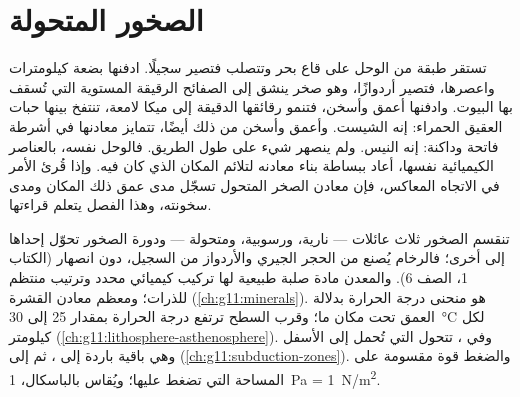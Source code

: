 \chapter{الصخور المتحولة}\label{ch:g12:metamorphic-rocks}

تستقر طبقة من الوحل على قاع بحر وتتصلب فتصير سجيلًا. ادفنها بضعة
كيلومترات واعصرها، فتصير أردوازًا، وهو صخر ينشق إلى
الصفائح الرقيقة المستوية التي تُسقف بها البيوت. وادفنها أعمق وأسخن، فتنمو رقائقها الدقيقة
إلى ميكا لامعة، تنتفخ بينها حبات العقيق الحمراء: إنه الشيست.
وأعمق وأسخن من ذلك أيضًا، تتمايز معادنها في أشرطة فاتحة وداكنة:
إنه النيس. ولم ينصهر شيء على طول الطريق. فالوحل نفسه، بالعناصر
الكيميائية نفسها، أعاد ببساطة بناء معادنه لتلائم المكان الذي
كان فيه. وإذا قُرئ الأمر في الاتجاه المعاكس، فإن معادن الصخر المتحول تسجّل مدى عمق
ذلك المكان ومدى سخونته، وهذا الفصل يتعلم قراءتها.

\begin{recall}
تنقسم الصخور ثلاث عائلات --- نارية، ورسوبية، ومتحولة ---
ودورة الصخور تحوّل إحداها إلى أخرى؛ فالرخام يُصنع من الحجر الجيري
والأردواز من السجيل، دون انصهار (الكتاب 1، الصف 6). والمعدن مادة صلبة
طبيعية لها تركيب كيميائي محدد وترتيب منتظم
للذرات؛ ومعظم معادن القشرة 
(\cref{ch:g11:minerals}).  هو منحنى درجة الحرارة بدلالة
العمق تحت مكان ما؛ وقرب السطح ترتفع درجة الحرارة بمقدار 25 إلى
\qty{30}{\celsius} لكل كيلومتر (\cref{ch:g11:lithosphere-asthenosphere}).
وفي ، تتحول  التي تُحمل إلى الأسفل وهي باقية باردة
إلى ، ثم إلى  (\cref{ch:g11:subduction-zones}).
والضغط قوة مقسومة على المساحة التي تضغط عليها؛ ويُقاس
بالباسكال، \qty{1}{Pa} = \qty{1}{N/m^2}.
\end{recall}

